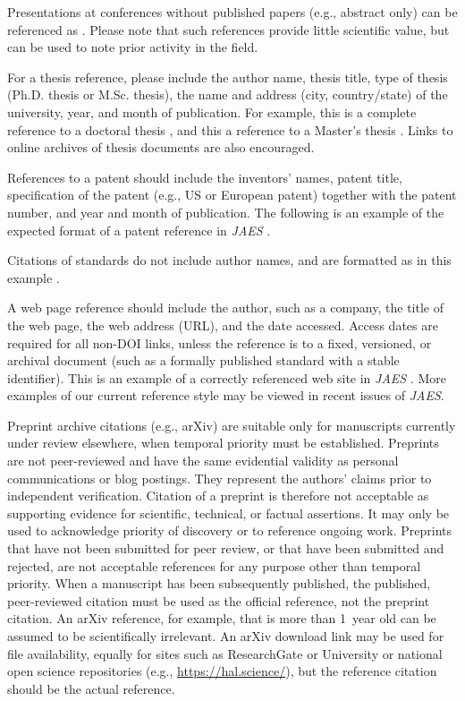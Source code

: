 \documentclass[fleqn]{jaes}
\begin{document}
Presentations at conferences without published papers (e.g., abstract only) can be referenced as \cite{a_conference_presentation}. Please note that such references provide little scientific value, but can be used to note prior activity in the field. 

For a thesis reference, please include the author name, thesis title, type of thesis (Ph.D. thesis or M.Sc. thesis), the name and address (city, country/state) of the university, year, and month of publication. For example, this is a complete reference to a doctoral thesis \cite{a_PhD_thesis}, and this a reference to a Master's thesis \cite{an_MSc_thesis}. Links to online archives of thesis documents are also encouraged.

References to a patent should include the inventors’ names, patent title, specification of the patent (e.g., US or European patent) together with the patent number, and year and month of publication. The following is an example of the expected format of a patent reference in \emph{JAES} \cite{a_patent}. 

Citations of standards do not include author names, and are formatted as in this example \cite{a_standard}.

A web page reference should include the author, such as a company, the title of the web page, the web address (URL), and the date accessed.
Access dates are required for all non-DOI links, unless the reference is to a fixed, versioned, or archival document (such as a formally published standard with a stable identifier). This is an example of a correctly referenced web site in \emph{JAES} \cite{a_web_page}. More examples of our current reference style may be viewed in recent issues of \emph{JAES}.

Preprint archive citations (e.g., arXiv) are suitable only for manuscripts currently under review elsewhere, when temporal priority must be established. Preprints are not peer-reviewed and have the same evidential validity as personal communications or blog postings. They represent the authors’ claims prior to independent verification. Citation of a preprint is therefore not acceptable as supporting evidence for scientific, technical, or factual assertions. It may only be used to acknowledge priority of discovery or to reference ongoing work. Preprints that have not been submitted for peer review, or that have been submitted and rejected, are not acceptable references for any purpose other than temporal priority. When a manuscript has been subsequently published, the published, peer-reviewed citation must be used as the official reference, not the preprint citation. An arXiv reference, for example, that is more than 1~year old can be assumed to be scientifically irrelevant. An arXiv download link may be used for file availability, equally for sites such as ResearchGate or University or national open science repositories (e.g., \url{https://hal.science/}), but the reference citation should be the actual reference. 
\end{document}
